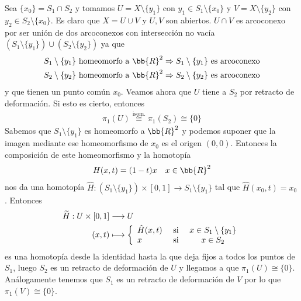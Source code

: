 \begin{ejemplo}
\begin{enumerate}
        Sea $\{x_0\} = S_1\cap S_2$ y tomamos $U=X\setminus\{y_1\}$ con $y_1\in S_1\setminus\{x_0\}$ y $V=X\setminus\{y_2\}$ con $y_2\in S_2\setminus\{x_0\}$. Es claro que $X=U \cup V$ y $U,V$ son abiertos. $U\cap V$ es arcoconexo por ser unión de dos arcoconexos con intersección no vacía $(S_1\setminus\{y_1\})\cup (S_2\setminus\{y_2\})$ ya que 
        \begin{gather*}
            S_1\setminus\{y_1\} \text{ homeomorfo a } \bb{R}^2 \Rightarrow S_1\setminus\{y_1\} \text{ es arcoconexo}\\
            S_2\setminus\{y_2\} \text{ homeomorfo a } \bb{R}^2 \Rightarrow S_2\setminus\{y_2\} \text{ es arcoconexo}
        \end{gather*}
        y que tienen un punto común $x_0$. Veamos ahora que $U$ tiene a $S_2$ por retracto de deformación. Si esto es cierto, entonces 
        \begin{gather*}
            \pi_1(U)\overset{\text{isom.}}{\cong}\pi_1(S_2)\cong \{0\}
        \end{gather*}
        Sabemos que $S_1\setminus\{y_1\}$ es homeomorfo a $\bb{R}^2$ y podemos suponer que la imagen mediante ese homeomorfismo de $x_0$ es el origen $(0,0)$. Entonces la composición de este homeomorfismo y la homotopía 
        \begin{gather*}
            H(x,t) = (1-t)x \ \ \ x\in \bb{R}^2
        \end{gather*}
        nos da una homotopía $\hat{H}:(S_1\setminus \{y_1\}) \times [0,1] \to S_1\setminus \{y_1\}$ tal que $\hat{H}(x_0,t)=x_0$. Entonces
        \begin{align*}
            \tilde{H}:U \times [0,1] & \longrightarrow U\\
            (x,t) & \longmapsto \left\{
                \begin{array}{l c c}
                    \hat{H}(x,t) & \text{ si } & x\in S_1\setminus \{y_1\}\\
                    x & \text{ si } & x\in S_2
                \end{array}
            \right.
        \end{align*}
        es una homotopía desde la identidad hasta la que deja fijos a todos los puntos de $S_1$, luego $S_2$ es un retracto de deformación de $U$ y llegamos a que $\pi_1(U)\cong \{0\}$.\\

        Análogamente tenemos que $S_1$ es un retracto de deformación de $V$ por lo que $\pi_1(V) \cong \{0\}$.\\


\end{enumerate}
\end{ejemplo}
